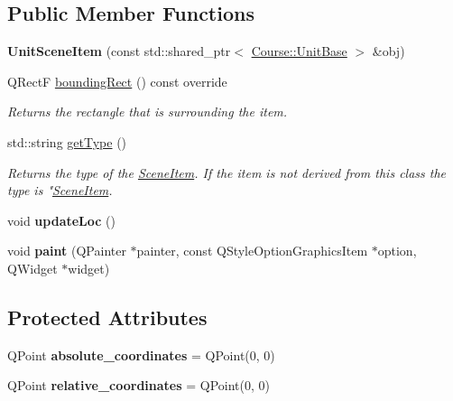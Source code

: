 \subsection*{Public Member Functions}
\begin{DoxyCompactItemize}
\item 
\hypertarget{class_student_1_1_unit_scene_item_a3370a4de80451debad536523e3b27ea5}{{\bfseries Unit\-Scene\-Item} (const std\-::shared\-\_\-ptr$<$ \hyperlink{class_course_1_1_unit_base}{Course\-::\-Unit\-Base} $>$ \&obj)}\label{class_student_1_1_unit_scene_item_a3370a4de80451debad536523e3b27ea5}

\item 
Q\-Rect\-F \hyperlink{class_student_1_1_unit_scene_item_ad326c46a9c5491766ab837bab74f7b05}{bounding\-Rect} () const override
\begin{DoxyCompactList}\small\item\em Returns the rectangle that is surrounding the item. \end{DoxyCompactList}\item 
std\-::string \hyperlink{class_student_1_1_unit_scene_item_ad50fcee7d5cba306787bd8222ff2954f}{get\-Type} ()
\begin{DoxyCompactList}\small\item\em Returns the type of the \hyperlink{class_student_1_1_scene_item}{Scene\-Item}. If the item is not derived from this class the type is "\hyperlink{class_student_1_1_scene_item}{Scene\-Item}. \end{DoxyCompactList}\item 
\hypertarget{class_student_1_1_unit_scene_item_a050b4107b8937eaaa27197de40f21fbe}{void {\bfseries update\-Loc} ()}\label{class_student_1_1_unit_scene_item_a050b4107b8937eaaa27197de40f21fbe}

\item 
\hypertarget{class_student_1_1_unit_scene_item_a01ce8c460191eca6b7453cce4c24acc6}{void {\bfseries paint} (Q\-Painter $\ast$painter, const Q\-Style\-Option\-Graphics\-Item $\ast$option, Q\-Widget $\ast$widget)}\label{class_student_1_1_unit_scene_item_a01ce8c460191eca6b7453cce4c24acc6}

\end{DoxyCompactItemize}
\subsection*{Protected Attributes}
\begin{DoxyCompactItemize}
\item 
\hypertarget{class_student_1_1_unit_scene_item_ababf0d87f33b4a962ae383d2e717148f}{Q\-Point {\bfseries absolute\-\_\-coordinates} = Q\-Point(0, 0)}\label{class_student_1_1_unit_scene_item_ababf0d87f33b4a962ae383d2e717148f}

\item 
\hypertarget{class_student_1_1_unit_scene_item_ac88e9e725fc41cb6462c0534d8cc5b4d}{Q\-Point {\bfseries relative\-\_\-coordinates} = Q\-Point(0, 0)}\label{class_student_1_1_unit_scene_item_ac88e9e725fc41cb6462c0534d8cc5b4d}

\end{DoxyCompactItemize}


